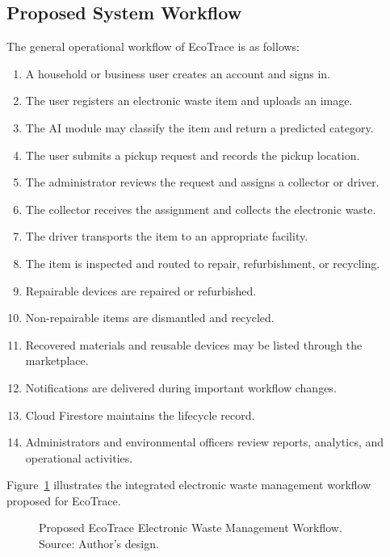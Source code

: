 \subsection{Proposed System Workflow}
The general operational workflow of EcoTrace is as follows:

\begin{enumerate}[leftmargin=1.4cm]
  \item A household or business user creates an account and signs in.
  \item The user registers an electronic waste item and uploads an image.
  \item The AI module may classify the item and return a predicted category.
  \item The user submits a pickup request and records the pickup location.
  \item The administrator reviews the request and assigns a collector or driver.
  \item The collector receives the assignment and collects the electronic waste.
  \item The driver transports the item to an appropriate facility.
  \item The item is inspected and routed to repair, refurbishment, or recycling.
  \item Repairable devices are repaired or refurbished.
  \item Non-repairable items are dismantled and recycled.
  \item Recovered materials and reusable devices may be listed through the
    marketplace.
  \item Notifications are delivered during important workflow changes.
  \item Cloud Firestore maintains the lifecycle record.
  \item Administrators and environmental officers review reports, analytics, and
    operational activities.
\end{enumerate}

Figure~\ref{fig:proposed-workflow} illustrates the integrated electronic waste
management workflow proposed for EcoTrace.

\begin{figure}[H]
  \centering
  \caption{Proposed EcoTrace Electronic Waste Management Workflow. Source: Author's design.}
  \label{fig:proposed-workflow}
\end{figure}

